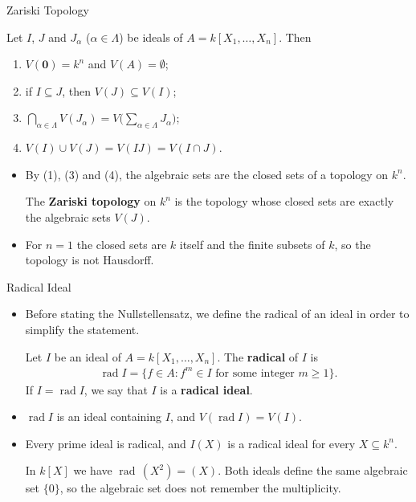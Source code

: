 \documentclass[10pt,aspectratio=1610]{beamer}
\DeclareMathOperator{\rad}{rad}
\begin{document}
    \begin{frame}{Zariski Topology}
        \begin{theorem}
            Let $I$, $J$ and $J_\alpha$ ($\alpha \in \Lambda$) be ideals of $A = k[X_1, \ldots, X_n]$. Then
            \begin{enumerate}
                \item $V(\mathbf{0}) = k^n$ and $V(A) = \emptyset$;
                \item if $I \subseteq J$, then $V(J) \subseteq V(I)$;
                \item $\bigcap_{\alpha \in \Lambda} V(J_\alpha) = V\bigl(\sum_{\alpha \in \Lambda} J_\alpha\bigr)$;
                \item $V(I) \cup V(J) = V(IJ) = V(I \cap J)$.
            \end{enumerate}
        \end{theorem}
        \begin{itemize}
            \item By (1), (3) and (4), the algebraic sets are the closed sets of a topology on $k^n$.
            \begin{definition}
                The \textbf{Zariski topology} on $k^n$ is the topology whose closed sets are exactly the algebraic sets $V(J)$.
            \end{definition}
            \item For $n = 1$ the closed sets are $k$ itself and the finite subsets of $k$, so the topology is not Hausdorff.
        \end{itemize}
    \end{frame}

    \begin{frame}{Radical Ideal}
        \begin{itemize}
            \item Before stating the Nullstellensatz, we define the radical of an ideal in order to simplify the statement.
            \begin{definition}
                Let $I$ be an ideal of $A = k[X_1, \ldots, X_n]$. The \textbf{radical} of $I$ is
                \begin{align*}
                    \rad I = \{ f \in A : f^m \in I \text{ for some integer } m \geq 1\}.
                \end{align*}
                If $I = \rad I$, we say that $I$ is a \textbf{radical ideal}.
            \end{definition}
            \item $\rad I$ is an ideal containing $I$, and $V(\rad I) = V(I)$.
            \item Every prime ideal is radical, and $I(X)$ is a radical ideal for every $X \subseteq k^n$.
            \begin{example}
                In $k[X]$ we have $\rad\,(X^2) = (X)$. Both ideals define the same algebraic set $\{0\}$, so the algebraic set does not remember the multiplicity.
            \end{example}
        \end{itemize}
    \end{frame}
\end{document}
